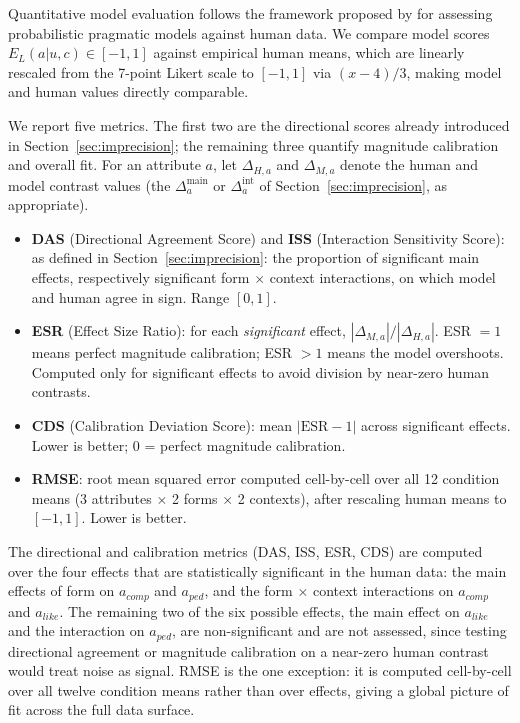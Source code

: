 \documentclass[12pt,a4paper]{article}
\begin{document}
Quantitative model evaluation follows the framework proposed by
\citet{muehlenbernd2026} for assessing probabilistic pragmatic models against
human data. We compare model scores $E_L(a|u,c) \in [-1,1]$ against empirical
human means, which are linearly rescaled from the 7-point Likert scale to
$[-1,1]$ via $(x-4)/3$, making model and human values directly comparable.

We report five metrics. The first two are the directional scores already
introduced in Section~\ref{sec:imprecision}; the remaining three quantify
magnitude calibration and overall fit. For an attribute $a$, let $\Delta_{H,a}$
and $\Delta_{M,a}$ denote the human and model contrast values (the
$\Delta^{\text{main}}_a$ or $\Delta^{\text{int}}_a$ of
Section~\ref{sec:imprecision}, as appropriate).

\begin{itemize}
\item \textbf{DAS} (Directional Agreement Score) and \textbf{ISS} (Interaction
Sensitivity Score): as defined in Section~\ref{sec:imprecision}: the proportion
of significant main effects, respectively significant form $\times$ context
interactions, on which model and human agree in sign. Range $[0,1]$.

\item \textbf{ESR} (Effect Size Ratio): for each \emph{significant} effect,
$|\Delta_{M,a}| / |\Delta_{H,a}|$. ESR $= 1$ means perfect magnitude
calibration; ESR $> 1$ means the model overshoots. Computed only for significant
effects to avoid division by near-zero human contrasts.

\item \textbf{CDS} (Calibration Deviation Score): mean $|\text{ESR} - 1|$ across
significant effects. Lower is better; $0$ = perfect magnitude calibration.

\item \textbf{RMSE}: root mean squared error computed cell-by-cell over all 12
condition means (3 attributes $\times$ 2 forms $\times$ 2 contexts), after
rescaling human means to $[-1,1]$. Lower is better.
\end{itemize}

The directional and calibration metrics (DAS, ISS, ESR, CDS) are computed over
the four effects that are statistically significant in the human data: the main
effects of form on $a_{comp}$ and $a_{ped}$, and the form $\times$ context
interactions on $a_{comp}$ and $a_{like}$. The remaining two of the six possible
effects, the main effect on $a_{like}$ and the interaction on $a_{ped}$, are
non-significant and are not assessed, since testing directional agreement or
magnitude calibration on a near-zero human contrast would treat noise as signal.
RMSE is the one exception: it is computed cell-by-cell over all twelve condition
means rather than over effects, giving a global picture of fit across the full
data surface.
\end{document}

